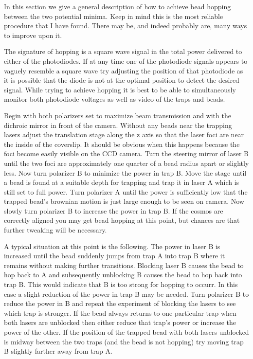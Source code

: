 
In this section we give a general description of how to achieve bead hopping between the two potential minima. Keep in mind this is the most reliable procedure that I have found. There may be, and indeed probably are, many ways to improve upon it.

The signature of hopping is a square wave signal in the total power delivered to either of the photodiodes. If at any time one of the photodiode signals appears to vaguely resemble a square wave try adjusting the position of that photodiode as it is possible that the diode is not at the optimal position to detect the desired signal. While trying to achieve hopping it is best to be able to simultaneously monitor both photodiode voltages as well as video of the traps and beads.

Begin with both polarizers set to maximize beam transmission and with the dichroic mirror in front of the camera. Without any beads near the trapping lasers adjust the translation stage along the z axis so that the laser foci are near the inside of the coverslip. It should be obvious when this happens because the foci become easily visible on the CCD camera. Turn the steering mirror of laser B until the two foci are approximately one quarter of a bead radius apart or slightly less. Now turn polarizer B to minimize the power in trap B. Move the stage until a bead is found at a suitable depth for trapping and trap it in laser A which is still set to full power. Turn polarizer A until the power is sufficiently low that the trapped bead's brownian motion is just large enough to be seen on camera. Now slowly turn polarizer B to increase the power in trap B. If the cosmos are correctly aligned you may get bead hopping at this point, but chances are that further tweaking will be necessary.

A typical situation at this point is the following. The power in laser B is increased until the bead suddenly jumps from trap A into trap B where it remains without making further transitions. Blocking laser B causes the bead to hop back to A and subsequently unblocking B causes the bead to hop back into trap B. This would indicate that B is too strong for hopping to occurr. In this case a slight reduction of the power in trap B may be needed. Turn polarizer B to reduce the power in B and repeat the experiment of blocking the lasers to see which trap is stronger. If the bead always returns to one particular trap when both lasers are unblocked then either reduce that trap's power or increase the power of the other. If the position of the trapped bead with both lasers unblocked is midway between the two traps (and the bead is not hopping) try moving trap B slightly farther away from trap A.

